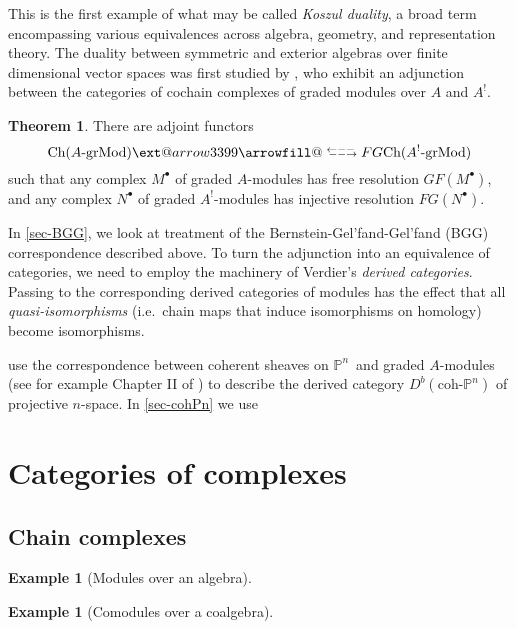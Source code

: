 \documentclass[a4paper]{article}
\makeatletter
\theoremstyle{definition}
\newtheorem*{theorem*}{Theorem}
\newtheorem{example}[defn]{Example}
\theoremstyle{remark}
\newcommand{\leftrarrows}{\mathrel{\raise.75ex\hbox{\oalign{%
  $\scriptstyle\leftarrow$\cr
  \vrule width0pt height.5ex$\hfil\scriptstyle\relbar$\cr}}}}
\newcommand{\lrightarrows}{\mathrel{\raise.75ex\hbox{\oalign{%
  $\scriptstyle\relbar$\hfil\cr
  $\scriptstyle\vrule width0pt height.5ex\smash\rightarrow$\cr}}}}
\newcommand{\Rrelbar}{\mathrel{\raise.75ex\hbox{\oalign{%
  $\scriptstyle\relbar$\cr
  \vrule width0pt height.5ex$\scriptstyle\relbar$}}}}
\def\leftrightarrowsfill@{\arrowfill@\leftrarrows\Rrelbar\lrightarrows}
\newcommand{\xleftrightarrows}[2][]{\ext@arrow 3399\leftrightarrowsfill@{#1}{#2}}
\newcommand{\grMod}{\ensuremath{\text{-grMod}}}
\newcommand{\Ch}{\ensuremath{\text{Ch}}}
\newcommand{\Pn}{\ensuremath{\mathbb{P}^n}}
\newcommand{\coh}{\ensuremath{\text{coh-}}}
\makeatother
\begin{document}
This is the first example of what may be called \textit{Koszul duality}, a broad
term encompassing various equivalences across algebra, geometry, and representation
theory. The duality between symmetric and exterior algebras over finite
dimensional vector spaces was first studied by
, who exhibit an adjunction between the
categories of cochain complexes of graded modules over \(A\) and \(A^!\).  
\begin{theorem*}
    There are adjoint functors
    \[ \Ch(A\grMod) \xleftrightarrows[F]{G} \Ch(A^!\grMod)\]
    such that any complex \(M^\bullet\) of graded
    \(A\)-modules has free resolution \(GF(M^\bullet)\), and any complex
    \(N^\bullet\) of graded \(A^!\)-modules has injective resolution
    \(FG(N^\bullet)\). 
\end{theorem*}
In \cref{sec-BGG}, we look at 
treatment of the Bernstein-Gel'fand-Gel'fand (BGG) correspondence described
above. To turn the adjunction into an equivalence of categories, we need to
employ the machinery of Verdier's \textit{derived categories}. Passing to the
corresponding derived categories of modules has the effect that all
\textit{quasi-isomorphisms} (i.e.\ chain maps that induce isomorphisms on
homology) become isomorphisms.

 use the correspondence between coherent
sheaves on \Pn\ and graded \(A\)-modules (see for example Chapter II of
) to describe the derived category
\(D^b(\coh\Pn)\) of projective \(n\)-space. In \ref{sec-cohPn} we use


\section{Categories of complexes}\label{sec-trianglecat}

\subsection{Chain complexes}

\begin{example}[Modules over an algebra]
\end{example}

\begin{example}[Comodules over a coalgebra]
\end{example}
\end{document}
